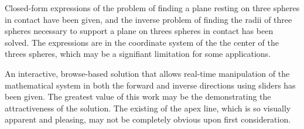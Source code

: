 \documentclass{article}
\begin{document}
Closed-form expressions of the problem of finding a plane resting on
three spheres in contact have been given, and the inverse problem
of finding the radii of three spheres necessary to support a plane
on threes spheres in contact has been solved.
The expressions are in the coordinate system of the the center
of the threes spheres, which may be a signifiant limitation for some
applications.

An interactive, browse-based solution that allows real-time manipulation
of the mathematical system in both the forward and inverse directions
using sliders has been given. The greatest value of this work
may be the demonstrating the attractiveness of the solution.
The existing of the apex line, which is so visually apparent and pleasing,
may not be completely obvious upon first consideration.

\printbibliography
\end{document}
